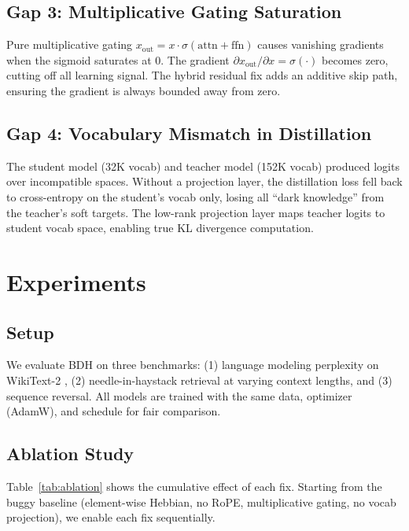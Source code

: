 \documentclass{article}
\begin{document}
\subsection{Gap 3: Multiplicative Gating Saturation}

Pure multiplicative gating $x_{\text{out}} = x \cdot \sigma(\text{attn} + \text{ffn})$ causes vanishing gradients when the sigmoid saturates at 0. The gradient $\partial x_{\text{out}} / \partial x = \sigma(\cdot)$ becomes zero, cutting off all learning signal. The hybrid residual fix adds an additive skip path, ensuring the gradient is always bounded away from zero.

\subsection{Gap 4: Vocabulary Mismatch in Distillation}

The student model (32K vocab) and teacher model (152K vocab) produced logits over incompatible spaces. Without a projection layer, the distillation loss fell back to cross-entropy on the student's vocab only, losing all ``dark knowledge'' from the teacher's soft targets. The low-rank projection layer maps teacher logits to student vocab space, enabling true KL divergence computation.

\section{Experiments}

\subsection{Setup}

We evaluate BDH on three benchmarks: (1) language modeling perplexity on WikiText-2 \citep{merity2016wikitext}, (2) needle-in-haystack retrieval at varying context lengths, and (3) sequence reversal. All models are trained with the same data, optimizer (AdamW), and schedule for fair comparison.

\subsection{Ablation Study}

Table~\ref{tab:ablation} shows the cumulative effect of each fix. Starting from the buggy baseline (element-wise Hebbian, no RoPE, multiplicative gating, no vocab projection), we enable each fix sequentially.
\end{document}
